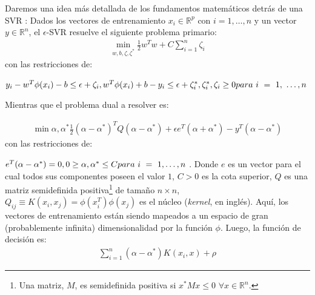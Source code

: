       Daremos una idea más detallada de los fundamentos matemáticos detrás de una
      SVR \cite{svr_tutorial}:
      Dados los vectores de entrenamiento $x_{i} \in \mathbb{R}^{p}$ con $i = 1, \dots ,n$
      y un vector $y \in \mathbb{R}^{n}$, el $\epsilon$-SVR resuelve el siguiente problema
      primario:
      \pagebreak
        \begin{align}
          \min\limits_{w, b, \zeta, \zeta^{*}} \frac{1}{2} w^{T} w + C \sum_{i = 1}^{n} \zeta_{i}
        \end{align}
      con las restricciones de:

      \begin{math}
        y_{i} - w^{T} \phi(x_{i}) - b \leq \epsilon + \zeta_{i}, \\
        w^{T} \phi(x_{i}) + b - y_{i} \leq \epsilon + \zeta^{*}_{i}, \\
              \zeta^{*}_{i}, \zeta_{i} \geq 0 \\
        para\ i\ =\ 1,\ \dots, n
      \end{math}

      Mientras que el problema dual a resolver es:

      \begin{align}
        \min\limits{\alpha, \alpha^{*}} \frac{1}{2} (\alpha - \alpha^{*})^{T}
        Q(\alpha - \alpha^{*}) + \epsilon e^{T} (\alpha + \alpha^{*}) -
        y^{T} (\alpha - \alpha^{*})
      \end{align}
      con las restricciones de:

      \begin{math}
        e^{T} (\alpha - \alpha^{*}) = 0, \\
        0 \geq \alpha, \alpha^{*} \leq C \\
        para\ i\ =\ 1, \dots, n
      \end{math}
    . Donde $e$ es un vector para el cual todos sus componentes poseen el valor $1$, $C > 0$
      es la cota superior, $Q$ es una matriz semidefinida
      positiva\footnote{Una matriz, $M$, es semidefinida positiva si $x^{*}Mx \leq 0$
      $\forall x \in \mathbb{R}^{n}$.} de tamaño $n \times n$,
      $Q_{ij} \equiv K(x_{i}, x_{j}) = \phi(x_{i}^{T})\phi(x_{j})$ es el núcleo
      (\textit{kernel}, en inglés). Aquí, los vectores de entrenamiento están siendo mapeados
      a un espacio de gran (probablemente infinita) dimensionalidad por la función
      $\phi$.
      Luego, la función de decisión es:
      \begin{align}
        \sum_{i = 1}^{n} (\alpha - \alpha^{*})K(x_{i}, x) + \rho
      \end{align}


